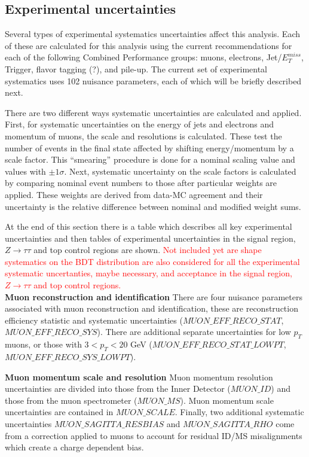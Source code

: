 \subsection{Experimental uncertainties}
Several types of experimental systematics uncertainties affect this analysis. Each of these are calculated for this analysis using the current recommendations for each of the following Combined Performance groups: muons, electrons, Jet/$E_T^{miss}$, Trigger, flavor tagging (?), and pile-up. The current set of experimental systematics uses 102 nuisance parameters, each of which will be briefly described next.
 
There are two different ways systematic uncertainties are calculated and applied. First, for systematic uncertainties on the energy of jets and electrons and momentum of muons, the scale and resolutions is calculated. These test the number of events in the final state affected by shifting energy/momentum by a scale factor. This ``smearing'' procedure is done for a nominal scaling value and values with $\pm 1 \sigma$. Next, systematic uncertainty on the scale factors is calculated by comparing nominal event numbers to those after particular weights are applied. These weights are derived from data-MC agreement and their uncertainty is the relative difference between nominal and modified weight sums.  
 
At the end of this section there is a table which describes all key experimental uncertainties and then tables of experimental uncertainties in the signal region, $Z\rightarrow \tau\tau$ and top control regions are shown. \textcolor{red}{Not included yet are shape systematics on the BDT distribution are also considered for all the experimental systematic uncertanties, maybe necessary, and acceptance in the signal region, $Z\rightarrow\tau\tau$ and top control regions.}
\\
\textbf{Muon reconstruction and identification}
There are four nuisance parameters associated with muon reconstruction and identification, these are reconstruction efficiency statistic and systematic uncertainties ($MUON\_EFF\_RECO\_STAT$, $MUON\_EFF\_RECO\_SYS$). There are additional separate uncertainties for low $p_T$ muons, or those with $3 < p_T <20$ GeV ($MUON\_EFF\_RECO\_STAT\_LOWPT$, $MUON\_EFF\_RECO\_SYS\_LOWPT$).

\textbf{Muon momentum scale and resolution}
Muon momentum resolution uncertainties are divided into those from the Inner Detector ($MUON\_ID$) and those from the muon spectrometer ($MUON\_MS$). Muon momentum scale uncertainties are contained in $MUON\_SCALE$. Finally, two additional systematic uncertainties $MUON\_SAGITTA\_RESBIAS$ and $MUON\_SAGITTA\_RHO$ come from a correction applied to muons to account for residual ID/MS misalignments which create a charge dependent bias.  

